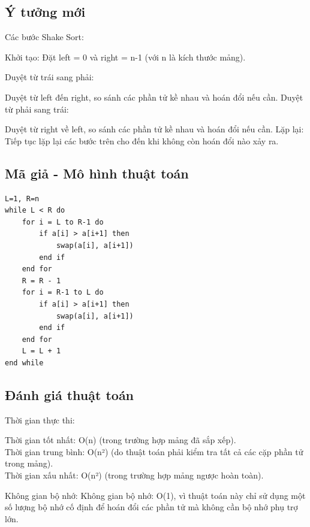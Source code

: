 \documentclass[12pt,a4paper]{report}
\begin{document}
\subsection {Ý tưởng mới}

Các bước Shake Sort:

Khởi tạo: Đặt left = 0 và right = n-1 (với n là kích thước mảng).

Duyệt từ trái sang phải:

Duyệt từ left đến right, so sánh các phần tử kề nhau và hoán đổi nếu cần.
Duyệt từ phải sang trái:

Duyệt từ right về left, so sánh các phần tử kề nhau và hoán đổi nếu cần.
Lặp lại: Tiếp tục lặp lại các bước trên cho đến khi không còn hoán đổi nào xảy ra.

\subsection{ Mã giả - Mô hình thuật toán}



\begin{lstlisting}
L=1, R=n
while L < R do
    for i = L to R-1 do
        if a[i] > a[i+1] then
            swap(a[i], a[i+1])
        end if
    end for
    R = R - 1
    for i = R-1 to L do
        if a[i] > a[i+1] then
            swap(a[i], a[i+1])
        end if
    end for
    L = L + 1
end while
\end{lstlisting}

\subsection{ Đánh giá thuật toán}

{Thời gian thực thi:

\hspace{0.5cm} Thời gian tốt nhất: O(n) (trong trường hợp mảng đã sắp xếp).\\

\hspace{0.5cm} Thời gian trung bình: O(n²) (do thuật toán phải kiểm tra tất cả các cặp phần tử trong mảng).\\

\hspace{0.5cm} Thời gian xấu nhất: O(n²) (trong trường hợp mảng ngược hoàn toàn).\\}

{Không gian bộ nhớ: Không gian bộ nhớ: O(1), vì thuật toán này chỉ sử dụng một số lượng bộ nhớ cố định để hoán đổi các phần tử mà không cần bộ nhớ phụ trợ lớn.}
\end{document}
